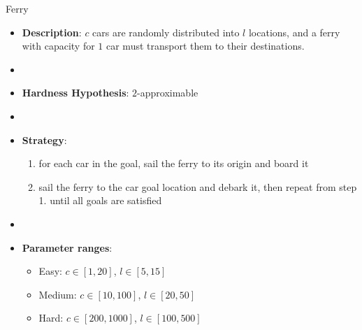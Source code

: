 \documentclass[aspectratio=169,xcolor=dvipsnames]{beamer}
\begin{document}
\begin{frame}{Ferry}
    \begin{itemize}
        \item \textbf{Description}: $c$ cars are randomly distributed into $l$ locations, and a ferry with capacity for $1$ car must transport them to their destinations.
        \item[]
        \item \textbf{Hardness Hypothesis}: $2$-approximable %
        \item[]
        \item \textbf{Strategy}:
        \begin{enumerate}
            \item for each car in the goal, sail the ferry to its origin and board it
            \item sail the ferry to the car goal location and debark it, then repeat from step 1. until all goals are satisfied
        \end{enumerate}
        \item[]
        \item \textbf{Parameter ranges}:
        \begin{itemize}
            \item Easy: $c\in[1, 20]$, $l \in [5, 15]$
            \item Medium: $c\in[10, 100]$, $l \in [20, 50]$
            \item Hard: $c\in[200, 1000]$, $l \in [100, 500]$
        \end{itemize}
    \end{itemize}
\end{frame}
\end{document}
